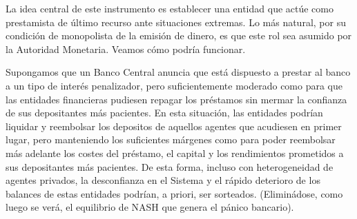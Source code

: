 \documentclass[10pt,a4paper]{article}
\begin{document}
La idea central de este instrumento es establecer una entidad que actúe como prestamista de último recurso ante situaciones extremas. Lo más natural, por su condición de monopolista de la emisión de dinero, es que este rol sea asumido por la Autoridad Monetaria. Veamos cómo podría funcionar.

Supongamos que un Banco Central anuncia que está dispuesto a prestar al banco a un tipo de interés penalizador, pero suficientemente moderado como para que las entidades financieras pudiesen repagar los préstamos sin mermar la confianza de sus depositantes más pacientes. En esta situación, las entidades podrían liquidar y reembolsar los depositos de aquellos agentes que acudiesen en primer lugar, pero manteniendo los suficientes márgenes como para poder reembolsar más adelante los costes del préstamo, el capital y los rendimientos prometidos a sus depositantes más pacientes. De esta forma, incluso con heterogeneidad de agentes privados, la desconfianza en el Sistema y el rápido deterioro de los balances de estas entidades podrían, a priori, ser sorteados. (Eliminádose, como luego se verá, el equilibrio de NASH que genera el pánico bancario).
\end{document}
